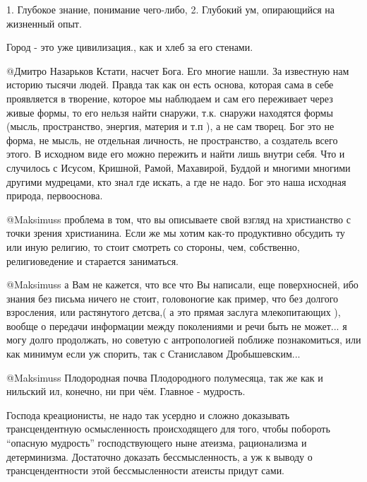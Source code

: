 \begin{multicols}{2}
\begin{itemize}
1. Глубокое знание, понимание чего-либо, 
2. Глубокий ум, опирающийся на жизненный опыт.


Город - это уже цивилизация., как и хлеб за его стенами.


@Дмитро Назарьков  Кстати, насчет Бога. Его многие нашли. За известную нам
историю тысячи людей. Правда так как он есть основа, которая сама в себе
проявляется в творение, которое мы наблюдаем и сам его переживает через живые
формы, то его нельзя найти снаружи, т.к. снаружи находятся формы (мысль,
пространство, энергия, материя и т.п ), а не сам творец. Бог это не форма, не
мысль, не отдельная личность, не пространство, а создатель всего этого. В
исходном виде его можно пережить и найти лишь внутри себя. Что и случилось с
Исусом, Кришной, Рамой, Махавирой, Буддой и многими многими другими мудрецами,
кто знал где искать, а где не надо. Бог это наша исходная природа,
первооснова.


@Maksimuss  проблема в том, что вы описываете свой взгляд на христианство с
точки зрения христианина. Если же мы хотим как-то продуктивно обсудить ту или
иную религию, то стоит смотреть со стороны, чем, собственно, религиоведение и
старается заниматься.


@Maksimuss  а Вам не кажется, что все что Вы написали, еще поверхносней, ибо
знания без письма ничего не стоит, головоногие как пример, что без долгого
взросления, или растянутого детсва,( а это прямая заслуга млекопитающих ),
вообще о передачи информации между поколениями и речи быть не может... я могу
долго продолжать, но советую с антропологией поближе познакомиться, или как
минимум если уж спорить, так с Станиславом Дробышевским...


@Maksimuss  Плодородная почва Плодородного полумесяца, так же как и нильский
ил, конечно, ни при чём. Главное - мудрость.
\end{itemize} %


Господа креационисты, не надо так усердно и сложно доказывать трансцендентную
осмысленность происходящего для того, чтобы побороть \enquote{опасную мудрость}
господствующего ныне атеизма, рационализма и детерминизма. Достаточно доказать
бессмысленность, а уж к выводу о трансцендентности этой бессмысленности атеисты
придут сами.


\end{multicols}
